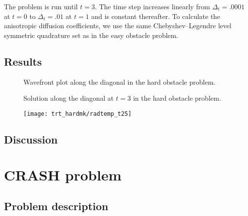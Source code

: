The problem is run until $t=3$. The time step increases linearly from $\Delta_t=.0001$ at
$t=0$ to $\Delta_t=.01$ at $t=1$ and is constant thereafter. To calculate the
anisotropic diffusion coefficients, we use the same Chebyshev--Legendre level
symmetric quadrature set as in the easy obstacle problem.

\subsection{Results}

\begin{figure}[htb]
  \centering
  
  \caption{Wavefront plot along the diagonal in the hard obstacle problem.}
  \label{fig:hardmkWavefront}
\end{figure}

\begin{figure}[htb]
  \centering
  \caption{Solution along the diagonal at $t=3$ in the hard obstacle problem.}
  \label{fig:hardmkCenterline}
\end{figure}

\begin{figure}[htb]
  \centering
  \hspace{-1in}%
  \texttt{[image: trt\_hardmk/radtemp\_t25]}
  \label{fig:hardmkConvergence}
\end{figure}

\subsection{Discussion}

\clearpage
\section{CRASH problem}

\subsection{Problem description}

